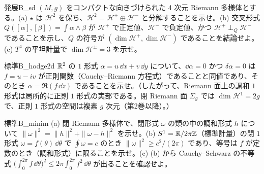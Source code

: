 \begin{probl}{発展}{B_sd}
$(M,g)$ をコンパクトな向きづけられた 4 次元 Riemann 多様体とする。(a) $\star$ は $\mathcal H^2$ を保ち、$\mathcal H^2=\mathcal H^+\oplus\mathcal H^-$ と分解することを示せ。(b) 交叉形式 $Q([\alpha],[\beta])=\int\alpha\wedge\beta$ が $\mathcal H^+$ で正定値、$\mathcal H^-$ で負定値、かつ $\mathcal H^+\perp_Q\mathcal H^-$ であることを示し、$Q$ の符号が $(\dim\mathcal H^+,\dim\mathcal H^-)$ であることを結論せよ。(c) $T^4$ の平坦計量で $\dim\mathcal H^\pm=3$ を示せ。
\end{probl}

\begin{probl}{標準}{B_hodge2d}
$\mathbb R^2$ の $1$ 形式 $\alpha=u\,\dd x+v\,\dd y$ について、$\dd\alpha=0$ かつ $\delta\alpha=0$ は $f=u-iv$ が正則関数（Cauchy--Riemann 方程式）であることと同値であり、そのとき $\alpha=\Re(f\,\dd z)$ であることを示せ。（したがって、Riemann 面上の調和 $1$ 形式は局所的に正則 $1$ 形式の実部である。閉 Riemann 面 $\Sigma_g$ では $\dim\mathcal H^1=2g$ で、正則 $1$ 形式の空間は複素 $g$ 次元（第2巻以降）。）
\end{probl}

\begin{probl}{標準}{B_minim}
(a) 閉 Riemann 多様体で、閉形式 $\omega$ の類の中の調和形式 $h$ について $\|\omega\|^2=\|h\|^2+\|\omega-h\|^2$ を示せ。(b) $S^1=\mathbb R/2\pi\mathbb Z$（標準計量）の閉 $1$ 形式 $\omega=f(\theta)\,\dd\theta$ で $\oint\omega=c$ のとき $\|\omega\|^2\ge c^2/(2\pi)$ であり、等号は $f$ が定数のとき（調和形式）に限ることを示せ。(c) (b) から Cauchy--Schwarz の不等式 $\bigl(\int_0^{2\pi}f\,\dd\theta\bigr)^2\le2\pi\int_0^{2\pi}f^2\,\dd\theta$ が出ることを確認せよ。
\end{probl}
